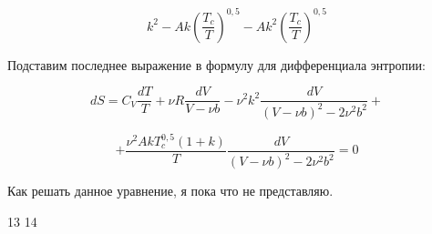 \documentclass[a4paper,14pt]{article}
\theoremstyle{plain} %
\theoremstyle{definition} %
\theoremstyle{remark} %
\begin{document}
$$ k^2 - A k \left( \frac{T_c}{T} \right)^{0,5} - A k^2 \left( \frac{T_c}{T} \right)^{0,5} $$

Подставим последнее выражение в формулу для дифференциала энтропии:

$$ d S = C_V \frac{d T}{T} + \nu R \frac{d V}{V - \nu b} - \nu^2 k^2 \frac{d V}{(V - \nu b)^2 - 2 \nu^2 b^2} +  $$

$$ + \frac{\nu^2 A k T_c^{0,5}(1 + k)}{T} \frac{d V}{(V - \nu b)^2 - 2 \nu^2 b^2} = 0 $$

Как решать данное уравнение, я пока что не представляю.

\newpage

13
14
\end{document}
